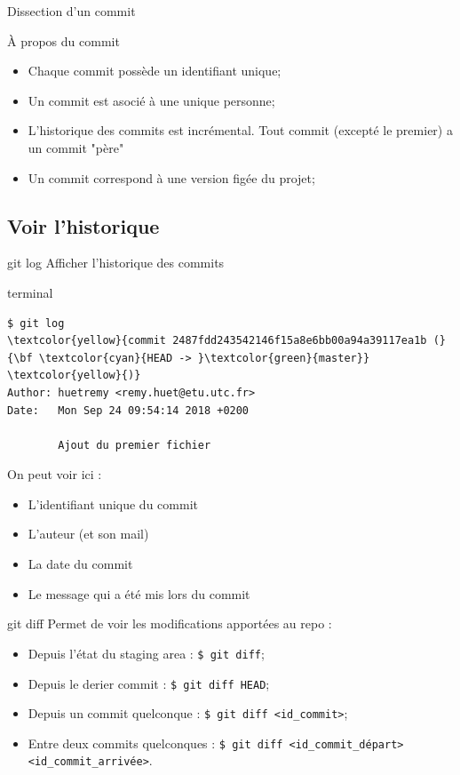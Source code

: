 \documentclass[usepdftitle=false]{beamer}
\def\seplength{.3\topsep}
\newcommand{\Pause}{%
\ifdef{\Release}
  {\pause}
  {}
}
\begin{document}
\begin{frame}{Dissection d'un commit}
	\begin{block}{À propos du commit}
		\begin{itemize}
			\item Chaque commit possède un identifiant unique;
			\item Un commit est asocié à une unique personne;
			\item L'historique des commits est incrémental. Tout commit (excepté le premier) a un commit "père"
			\item Un commit correspond à une version figée du projet;
		\end{itemize}
	\end{block}
\end{frame}

\subsection{Voir l'historique}

\begin{frame}[fragile]{git log}
	Afficher l'historique des commits
	\begin{beamercolorbox}[rounded=true,shadow=true]{terminal}
		\vspace{-\seplength}
		\begin{Verbatim}
$ git log
\textcolor{yellow}{commit 2487fdd243542146f15a8e6bb00a94a39117ea1b (}{\bf \textcolor{cyan}{HEAD -> }\textcolor{green}{master}} \textcolor{yellow}{)}
Author: huetremy <remy.huet@etu.utc.fr>
Date:   Mon Sep 24 09:54:14 2018 +0200

    	Ajout du premier fichier
		\end{Verbatim}
	\end{beamercolorbox}
	\Pause
	On peut voir ici : \Pause
	\begin{itemize}
		\item L'identifiant unique du commit \Pause
		\item L'auteur (et son mail) \Pause
		\item La date du commit \Pause
		\item Le message qui a été mis lors du commit
	\end{itemize}
\end{frame}

\begin{frame}[fragile]{git diff}
	Permet de voir les modifications apportées au repo :
	\begin{itemize}
		\item Depuis l'état du staging area : \verb+$ git diff+;
		\item Depuis le derier commit : \verb+$ git diff HEAD+;
		\item Depuis un commit quelconque : \verb+$ git diff <id_commit>+;
		\item Entre deux commits quelconques : \verb+$ git diff <id_commit_départ> <id_commit_arrivée>+.
	\end{itemize}
\end{frame}
\end{document}
